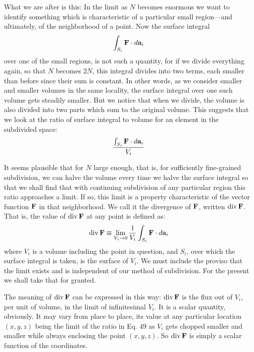 What we are after is this: In the limit as $N$ becomes enormous we
want to identify something which is characteristic of a particular
small region---and ultimately, of the neighborhood of a point. Now
the surface integral
\begin{equation}
  \int_{S_i} \mathbf{F}\cdot d \mathbf{a}_i
\end{equation}
over one of the small regions, is not such a quantity, for if we divide
everything again, so that $N$ becomes $2N$, this integral divides into two
terms, each smaller than before since their sum is constant. In other
words, as we consider smaller and smaller volumes in the same
locality, the surface integral over one such volume gets steadily
smaller. But we notice that when we divide, the volume is also
divided into two parts which sum to the original volume. This suggests
that we look at the ratio of surface integral to volume for an
element in the subdivided space:
\begin{equation}
  \frac{\int_{S_i} \mathbf{F}\cdot d \mathbf{a}_i}{V_i}
\end{equation}


It seems plausible that for $N$ large enough, that is, for sufficiently
fine-grained subdivision, we can halve the volume every time we
halve the surface integral so that we shall find that with continuing
subdivision of any particular region this ratio approaches a limit. If
so, this limit is a property characteristic of the vector function $\mathbf{F}$ in
that neighborhood. We call it the divergence of $\mathbf{F}$, written $\operatorname{div}\mathbf{F}$.
That is, the value of $\operatorname{div}\mathbf{F}$ at any point is defined as:
\begin{equation}
  \operatorname{div}\mathbf{F}\equiv \lim_{V_i\rightarrow0} \frac{1}{V_i} \int_{S_i} \mathbf{F}\cdot d \mathbf{a}_i
\end{equation}
where $V_i$ is a volume including the point in question, and $S_i$, over
which the surface integral is taken, is the surface of $V_i$. We must include
the proviso that the limit exists and is independent of our
method of subdivision. For the present we shall take that for
granted.

The meaning of $\operatorname{div}\mathbf{F}$ can be expressed in this way: $\operatorname{div}\mathbf{F}$ is the
flux out of $V_i$, per unit of volume, in the limit of infinitesimal $V_i$. It
is a scalar quantity, obviously. It may vary from place to place, its
value at any particular location $(x,y,z)$ being the limit of the ratio in
Eq. 49 as $V_i$ gets chopped smaller and smaller while always enclosing
the point $(x,y,z)$. So $\operatorname{div}\mathbf{F}$ is simply a scalar function of the
coordinates.

